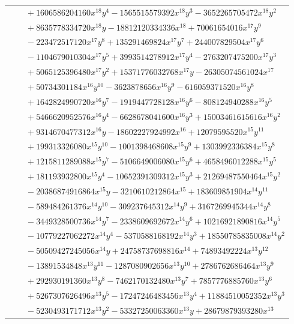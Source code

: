 \documentclass[11pt]{article}
\begin{document}
\begin{longtable}{@{}ll@{}}
 & $\quad +1606586204160x^{18}y^{4}-1565515579392x^{18}y^{3}-3652265705472x^{18}y^{2}$\\
 & $\quad +8635778334720x^{18}y-18812120334336x^{18}+70061654016x^{17}y^{9}$\\
 & $\quad -223472517120x^{17}y^{8}+135291469824x^{17}y^{7}+244007829504x^{17}y^{6}$\\
 & $\quad -1104679010304x^{17}y^{5}+3993514278912x^{17}y^{4}-2763207475200x^{17}y^{3}$\\
 & $\quad +5065125396480x^{17}y^{2}+15371776032768x^{17}y-26305074561024x^{17}$\\
 & $\quad +50734301184x^{16}y^{10}-3623878656x^{16}y^{9}-616059371520x^{16}y^{8}$\\
 & $\quad +1642824990720x^{16}y^{7}-1919447728128x^{16}y^{6}-808124940288x^{16}y^{5}$\\
 & $\quad +5466620952576x^{16}y^{4}-6628678041600x^{16}y^{3}+15003461615616x^{16}y^{2}$\\
 & $\quad +9314670477312x^{16}y-18602227924992x^{16}+12079595520x^{15}y^{11}$\\
 & $\quad +199313326080x^{15}y^{10}-1001398468608x^{15}y^{9}+1303992336384x^{15}y^{8}$\\
 & $\quad +1215811289088x^{15}y^{7}-5106649006080x^{15}y^{6}+4658496012288x^{15}y^{5}$\\
 & $\quad +181193932800x^{15}y^{4}-10652391309312x^{15}y^{3}+21269487550464x^{15}y^{2}$\\
 & $\quad -20386874916864x^{15}y-3210610212864x^{15}+183609851904x^{14}y^{11}$\\
 & $\quad -589484261376x^{14}y^{10}-309237645312x^{14}y^{9}+3167269945344x^{14}y^{8}$\\
 & $\quad -3449328500736x^{14}y^{7}-2338609692672x^{14}y^{6}+10216921890816x^{14}y^{5}$\\
 & $\quad -10779227062272x^{14}y^{4}-5370588168192x^{14}y^{3}+18550785835008x^{14}y^{2}$\\
 & $\quad -50509427245056x^{14}y+24758737698816x^{14}+74893492224x^{13}y^{12}$\\
 & $\quad -13891534848x^{13}y^{11}-1287080902656x^{13}y^{10}+2786762686464x^{13}y^{9}$\\
 & $\quad +292930191360x^{13}y^{8}-7462170132480x^{13}y^{7}+7857776885760x^{13}y^{6}$\\
 & $\quad +5267307626496x^{13}y^{5}-17247246483456x^{13}y^{4}+11884510052352x^{13}y^{3}$\\
 & $\quad -5230493171712x^{13}y^{2}-53327250063360x^{13}y+28679879393280x^{13}$\\

\end{longtable}
\end{document}
